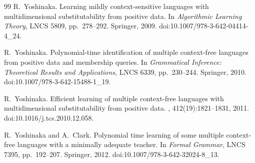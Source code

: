\documentclass[11pt,a4paper]{ltjsarticle}
\numberwithin{equation}{section}
\theoremstyle{plain}
\theoremstyle{definition}
\theoremstyle{remark}
\begin{document}
\begin{thebibliography}{99}
R.~Yoshinaka.
\newblock Learning mildly context-sensitive languages with multidimensional
 substitutability from positive data.
\newblock In {\em Algorithmic Learning Theory}, LNCS 5809, pp.~278--292.
 Springer, 2009.
\newblock doi:10.1007/978-3-642-04414-4\_24.

R.~Yoshinaka.
\newblock Polynomial-time identification of multiple context-free languages
from positive data and membership queries.
\newblock In {\em Grammatical Inference: Theoretical Results and Applications},
LNCS 6339, pp.~230--244. Springer, 2010.
\newblock doi:10.1007/978-3-642-15488-1\_19.

R.~Yoshinaka.
\newblock Efficient learning of multiple context-free languages with
multidimensional substitutability from positive data.
, 412(19):1821--1831, 2011.
\newblock doi:10.1016/j.tcs.2010.12.058.

R.~Yoshinaka and A.~Clark.
\newblock Polynomial time learning of some multiple context-free languages
with a minimally adequate teacher.
\newblock In {\em Formal Grammar}, LNCS 7395, pp.~192--207. Springer, 2012.
\newblock doi:10.1007/978-3-642-32024-8\_13.

\end{thebibliography}
\end{document}
